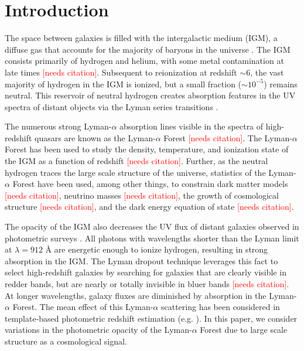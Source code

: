 \documentclass[twocolumn]{aastex631}
\newcommand{\note}[1]{\textsf{\textcolor{red}{#1}}\xspace}
\newcommand{\needscite}{\note{[needs citation]}}
\newcommand{\lya}{Lyman-$\alpha$\xspace}
\newcommand{\Ang}{\!\AA\xspace}
\begin{document}
\section{Introduction}
\label{sec:intro}

The space between galaxies is filled with the intergalactic medium (IGM), a diffuse gas that accounts for the majority of baryons in the universe \citep{mcquinn2016}.
The IGM consists primarily of hydrogen and helium, with some metal contamination at late times \needscite.
Subsequent to reionization at redshift $\sim 6$, the vast majority of hydrogen in the IGM is ionized, but a small fraction ($\sim 10^{-5}$) remains neutral.
This reservoir of neutral hydrogen creates absorption features in the UV spectra of distant objects via the Lyman series transitions \citep{gunn1965}.

The numerous strong \lya absorption lines visible in the spectra of high-redshift quasars are known as the \lya Forest \needscite.
The \lya Forest has been used to study the density, temperature, and ionization state of the IGM as a function of redshift \needscite.
Further, as the neutral hydrogen traces the large scale structure of the universe, statistics of the \lya Forest have been used, among other things, to constrain dark matter models \needscite, neutrino masses \needscite, the growth of cosmological structure \needscite, and the dark energy equation of state \needscite.

The opacity of the IGM also decreases the UV flux of distant galaxies observed in photometric surveys \citep{madau1995}.
All photons with wavelengths shorter than the Lyman limit at $\lambda = 912$ \Ang are energetic enough to ionize hydrogen, resulting in strong absorption in the IGM.
The Lyman dropout technique leverages this fact to select high-redshift galaxies by searching for galaxies that are clearly visible in redder bands, but are nearly or totally invisible in bluer bands \needscite.
At longer wavelengths, galaxy fluxes are diminished by absorption in the \lya Forest.
The mean effect of this \lya scattering has been considered in template-based photometric redshift estimation (e.g. \citealt{benitez2000, brammer2008}).
In this paper, we consider variations in the photometric opacity of the \lya Forest due to large scale structure as a cosmological signal.
\end{document}
